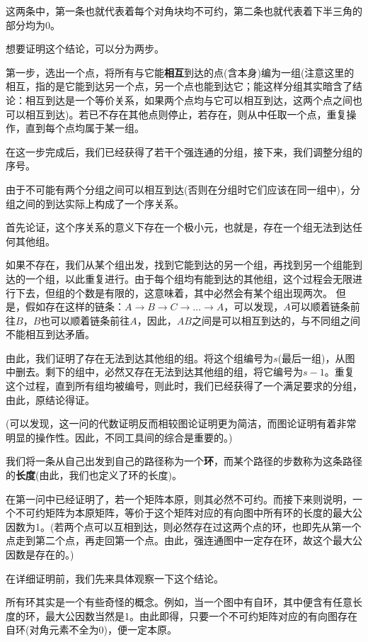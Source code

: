 \documentclass[a4paper,UTF8,fontset=windows]{ctexart}
\begin{document}
\begin{enumerate}
这两条中，第一条也就代表着每个对角块均不可约，第二条也就代表着下半三角的部分均为0。

想要证明这个结论，可以分为两步。

第一步，选出一个点，将所有与它能\textbf{相互}到达的点(含本身)编为一组(注意这里的相互，指的是它能到达另一个点，另一个点也能到达它；能这样分组其实暗含了结论：相互到达是一个等价关系，如果两个点均与它可以相互到达，这两个点之间也可以相互到达)。若已不存在其他点则停止，若存在，则从中任取一个点，重复操作，直到每个点均属于某一组。

在这一步完成后，我们已经获得了若干个强连通的分组，接下来，我们调整分组的序号。

由于不可能有两个分组之间可以相互到达(否则在分组时它们应该在同一组中)，分组之间的到达实际上构成了一个序关系。

首先论证，这个序关系的意义下存在一个极小元，也就是，存在一个组无法到达任何其他组。

如果不存在，我们从某个组出发，找到它能到达的另一个组，再找到另一个组能到达的一个组，以此重复进行。由于每个组均有能到达的其他组，这个过程会无限进行下去，但组的个数是有限的，这意味着，其中必然会有某个组出现两次。
但是，假如存在这样的链条：$A\to B\to C\to\dots\to A$，可以发现，$A$可以顺着链条前往$B$，$B$也可以顺着链条前往$A$，因此，$AB$之间是可以相互到达的，与不同组之间不能相互到达矛盾。

由此，我们证明了存在无法到达其他组的组。将这个组编号为$s$(最后一组)，从图中删去。剩下的组中，必然又存在无法到达其他组的组，将它编号为$s-1$。重复这个过程，直到所有组均被编号，则此时，我们已经获得了一个满足要求的分组，由此，原结论得证。

(可以发现，这一问的代数证明反而相较图论证明更为简洁，而图论证明有着非常明显的操作性。因此，不同工具间的综合是重要的。)

我们将一条从自己出发到自己的路径称为一个\textbf{环}，而某个路径的步数称为这条路径的\textbf{长度}(由此，我们也定义了环的长度)。

在第一问中已经证明了，若一个矩阵本原，则其必然不可约。而接下来则说明，一个不可约矩阵为本原矩阵，等价于这个矩阵对应的有向图中所有环的长度的最大公因数为1。(若两个点可以互相到达，则必然存在过这两个点的环，也即先从第一个点走到第二个点，再走回第一个点。由此，强连通图中一定存在环，故这个最大公因数是存在的。)

在详细证明前，我们先来具体观察一下这个结论。

所有环其实是一个有些奇怪的概念。例如，当一个图中有自环，其中便含有任意长度的环，最大公因数当然是1。由此即得，只要一个不可约矩阵对应的有向图存在自环(对角元素不全为0)，便一定本原。


\end{enumerate}
\end{document}
